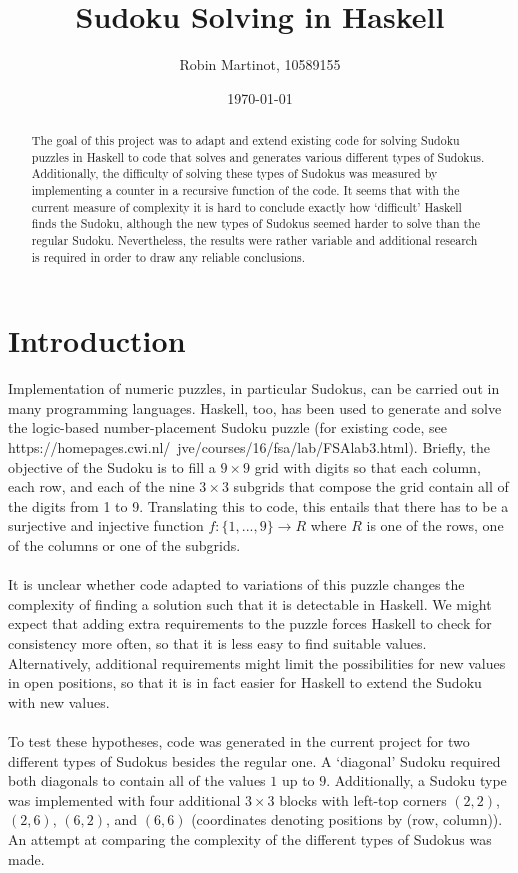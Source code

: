 \documentclass[12pt,a4paper]{article}
\title{Sudoku Solving in Haskell}
\author{Robin Martinot, 10589155}
\date{\today}
\begin{document}
\maketitle

\begin{abstract}
The goal of this project was to adapt and extend existing code for solving Sudoku
puzzles in Haskell to code that solves and generates various different types of Sudokus. Additionally, the difficulty of solving these types of Sudokus was measured
by implementing a counter in a recursive function of the code. It seems that with the
current measure of complexity it is hard to conclude exactly how `difficult' Haskell finds
the Sudoku, although the new types of Sudokus seemed harder to solve than the regular Sudoku.
Nevertheless, the results were rather variable and additional research is required in order
to draw any reliable conclusions.
\end{abstract}

\section{Introduction}
Implementation of numeric puzzles, in particular Sudokus, can be
carried out in many programming languages. Haskell, too, has been used to generate and solve
the logic-based number-placement Sudoku puzzle (for existing code, see https://homepages.cwi.nl/~jve/courses/16/fsa/lab/FSAlab3.html).
Briefly, the objective of the Sudoku is to fill a $9 \times 9$ grid with digits so that each column, each row, and each
of the nine $3 \times 3$ subgrids that compose the grid contain all of the digits
from 1 to 9. Translating this to code, this entails that there has to
be a surjective and injective function $f: \{1, ..., 9 \} \rightarrow R$ where $R$ is
one of the rows, one of the columns or one of the subgrids.\\\\
It is unclear whether code adapted to variations of this puzzle changes
the complexity of finding a solution such that it is detectable in Haskell. We might expect that adding
extra requirements to the puzzle forces Haskell to check for consistency more often, so that
it is less easy to find suitable values. Alternatively, additional requirements might limit the possibilities
for new values in open positions, so that it is in fact easier for Haskell to extend the Sudoku with new values.\\\\
To test these hypotheses, code was generated in the current project for two different types of Sudokus besides the regular one.
A `diagonal' Sudoku required both diagonals to contain all of the values $1$ up to $9$. Additionally,
a Sudoku type was implemented with four additional $3 \times 3$ blocks with left-top corners
$(2,2)$, $(2,6)$, $(6,2)$, and $(6,6)$ (coordinates denoting positions by (row, column)).
An attempt at comparing the complexity of the different types of Sudokus was made.
\end{document}
